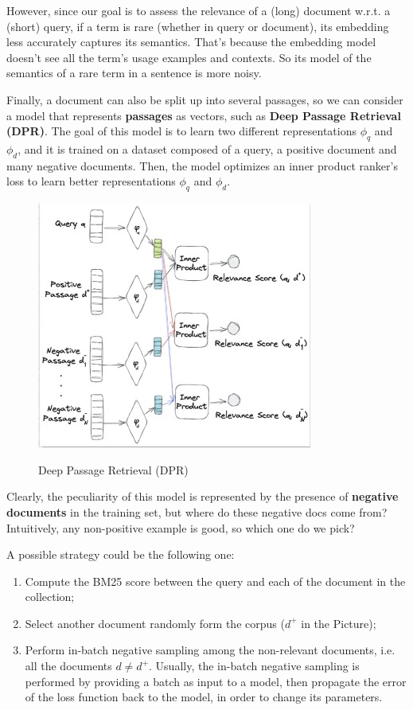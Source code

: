 However, since our goal is to assess the relevance of a (long) document w.r.t. a (short) query, if a term is rare (whether in query or document), its embedding less accurately captures its semantics. That's because the embedding model doesn't see all the term's usage examples and contexts. So its model of the semantics of a rare term in a sentence is more noisy.

Finally, a document can also be split up into several passages, so we can consider a model that represents \textbf{passages} as vectors, such as \textbf{Deep Passage Retrieval (DPR)}. The goal of this model is to learn two different representations $\phi_q$ and $\phi_d$, and it is trained on a dataset composed of a query, a positive document and many negative documents. Then, the model optimizes an inner product ranker's loss to learn better representations $\phi_q$ and $\phi_d$. 

\begin{figure}[h!]
		\centering
		\includegraphics[scale = 2.0]{img/dpr.jpg}
        \label{dpr}
        \caption{Deep Passage Retrieval (DPR)}
\end{figure}

Clearly, the peculiarity of this model is represented by the presence of \textbf{negative documents} in the training set, but where do these negative docs come from? Intuitively, any non-positive example is good, so which one do we pick?

A possible strategy could be the following one:

\begin{enumerate}
    \item Compute the BM25 score between the query and each of the document in the collection;
    \item Select another document randomly form the corpus ($d^{+}$ in the Picture);
    \item Perform in-batch negative sampling among the non-relevant documents, i.e. all the documents $d \neq d^{+}$. Usually, the in-batch negative sampling is performed by providing a batch as input to a model, then propagate the error of the loss function back to the model, in order to change its parameters.
\end{enumerate}


